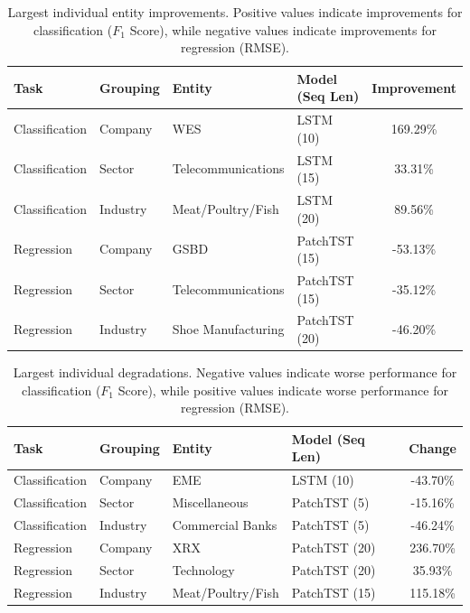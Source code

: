 \begin{table}[t]
\centering
\caption{Largest individual entity improvements. Positive values indicate improvements for classification ($F_1$ Score), while negative values indicate improvements for regression (RMSE).}
\label{tab:lstm_patchtst_best_entities}
\begin{tabular}{|l|l|l|l|c|}
\hline
Task & Grouping & Entity & Model (Seq Len) & Improvement \\
\hline
Classification & Company  & WES                   & LSTM (10)      & 169.29\% \\
Classification & Sector   & Telecommunications    & LSTM (15)      & 33.31\%  \\
Classification & Industry & Meat/Poultry/Fish    & LSTM (20)      & 89.56\%  \\
\hline
Regression & Company  & GSBD                 & PatchTST (15) & -53.13\% \\
Regression & Sector   & Telecommunications   & PatchTST (15) & -35.12\% \\
Regression & Industry & Shoe Manufacturing   & PatchTST (20) & -46.20\% \\
\hline
\end{tabular}
\end{table}

\begin{table}[t]
\centering
\caption{Largest individual degradations. Negative values indicate worse performance for classification ($F_1$ Score), while positive values indicate worse performance for regression (RMSE).}
\label{tab:lstm_patchtst_worst_entities}
\begin{tabular}{|l|l|l|l|c|}
\hline
Task & Grouping & Entity & Model (Seq Len) & Change \\
\hline
Classification & Company  & EME                  & LSTM (10)      & -43.70\% \\
Classification & Sector   & Miscellaneous        & PatchTST (5)   & -15.16\% \\
Classification & Industry & Commercial Banks     & PatchTST (5)   & -46.24\% \\
\hline
Regression & Company  & XRX                & PatchTST (20) & 236.70\% \\
Regression & Sector   & Technology         & PatchTST (20) & 35.93\%  \\
Regression & Industry & Meat/Poultry/Fish  & PatchTST (15) & 115.18\% \\
\hline
\end{tabular}
\end{table}

